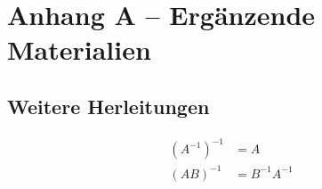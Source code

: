\chapter{Anhang A – Ergänzende Materialien}
\label{chap:anhang}

\section{Weitere Herleitungen}
\begin{align}
  (A^{-1})^{-1} &= A \\
  (AB)^{-1} &= B^{-1}A^{-1}
\end{align}
